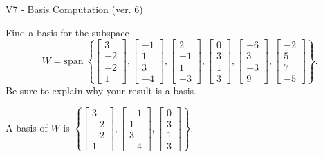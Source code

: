 \begin{exercise}
  \begin{exerciseTitle}V7 - Basis Computation (ver. 6)\end{exerciseTitle}
  \begin{exerciseStatement}
    Find a basis for the subspace 
\[W=\mathrm{span}\ \left\{\left[\begin{array}{r}
3 \\
-2 \\
-2 \\
1
\end{array}\right] , \left[\begin{array}{r}
-1 \\
1 \\
3 \\
-4
\end{array}\right] , \left[\begin{array}{r}
2 \\
-1 \\
1 \\
-3
\end{array}\right] , \left[\begin{array}{r}
0 \\
3 \\
1 \\
3
\end{array}\right] , \left[\begin{array}{r}
-6 \\
3 \\
-3 \\
9
\end{array}\right] , \left[\begin{array}{r}
-2 \\
5 \\
7 \\
-5
\end{array}\right]\right\}.\]
 Be sure to explain why your result is a basis.


  \end{exerciseStatement}
  \begin{exerciseAnswer}
   A basis of \(W\) is  \(\left\{\left[\begin{array}{r}
3 \\
-2 \\
-2 \\
1
\end{array}\right] , \left[\begin{array}{r}
-1 \\
1 \\
3 \\
-4
\end{array}\right] , \left[\begin{array}{r}
0 \\
3 \\
1 \\
3
\end{array}\right]\right\}\).
  


  \end{exerciseAnswer}
\end{exercise}